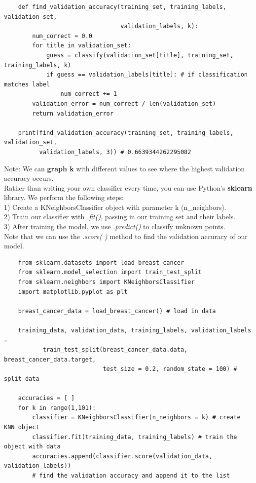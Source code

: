\documentclass[11pt, a4paper]{article}
\begin{document}
\begin{spacing}{1.1}
\begin{lstlisting}
	def find_validation_accuracy(training_set, training_labels, validation_set, 
	                             validation_labels, k):
		num_correct = 0.0
		for title in validation_set:
			guess = classify(validation_set[title], training_set, training_labels, k)
			if guess == validation_labels[title]: # if classification matches label
				num_correct += 1
		validation_error = num_correct / len(validation_set)
		return validation_error
	
	print(find_validation_accuracy(training_set, training_labels, validation_set, 
	      validation_labels, 3)) # 0.6639344262295082 \end{lstlisting}\vspace*{1mm}
	Note: We can \textbf{graph k} with different values to see where the highest validation accuracy occurs. \vspace*{2mm} \\
	Rather than writing your own classifier every time, you can use Python’s \textbf{sklearn} library. We perform the following steps: \\
	\hspace*{3mm} 1) Create a KNeighborsClassifier object with parameter k (n\_neighbors). \\
	\hspace*{3mm} 2) Train our classifier with \textit{.fit()}, passing in our training set and their labels. \\
	\hspace*{3mm} 3) After training the model, we use \textit{.predict()} to classify unknown points. \vspace*{1mm} \\
	Note that we can use the \textit{.score( )} method to find the validation accuracy of our model.
	\begin{lstlisting}
	from sklearn.datasets import load_breast_cancer
	from sklearn.model_selection import train_test_split 
	from sklearn.neighbors import KNeighborsClassifier
	import matplotlib.pyplot as plt 
	
	breast_cancer_data = load_breast_cancer() # load in data
	
	training_data, validation_data, training_labels, validation_labels = 
	       train_test_split(breast_cancer_data.data, breast_cancer_data.target, 
	                        test_size = 0.2, random_state = 100) # split data
	
	accuracies = [ ]
	for k in range(1,101):
		classifier = KNeighborsClassifier(n_neighbors = k) # create KNN object
		classifier.fit(training_data, training_labels) # train the object with data
		accuracies.append(classifier.score(validation_data, validation_labels))
		# find the validation accuracy and append it to the list
	

\end{lstlisting}
\end{spacing}
\end{document}
